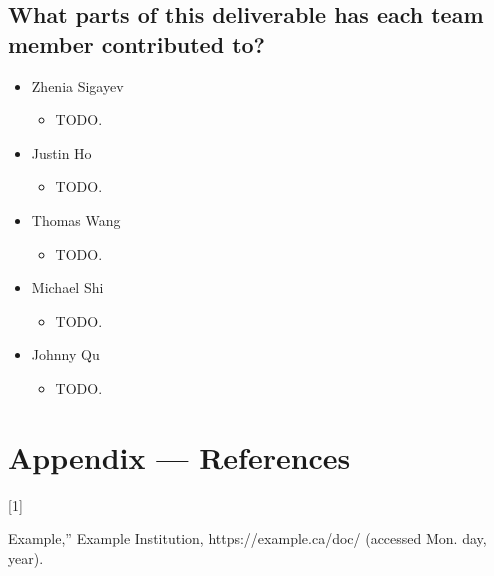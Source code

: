 \documentclass[12pt]{article}
\begin{document}
  \subsection{What parts of this deliverable has each team member contributed to?}
  \begin{itemize}
    \item Zhenia Sigayev
      \begin{itemize}[label=$\circ$]
        \item TODO.
      \end{itemize}
    \item Justin Ho
      \begin{itemize}[label=$\circ$]
        \item TODO.
      \end{itemize}
    \item Thomas Wang
      \begin{itemize}[label=$\circ$]
        \item TODO.
      \end{itemize}
    \item Michael Shi
      \begin{itemize}[label=$\circ$]
        \item TODO.
      \end{itemize}
    \item Johnny Qu
      \begin{itemize}[label=$\circ$]
        \item TODO.
      \end{itemize}
  \end{itemize}

\section*{Appendix --- References}
    \hypertarget{Ref1}{[1]} Example,” Example Institution, https://example.ca/doc/ (accessed Mon. day, year). \\



\end{document}
